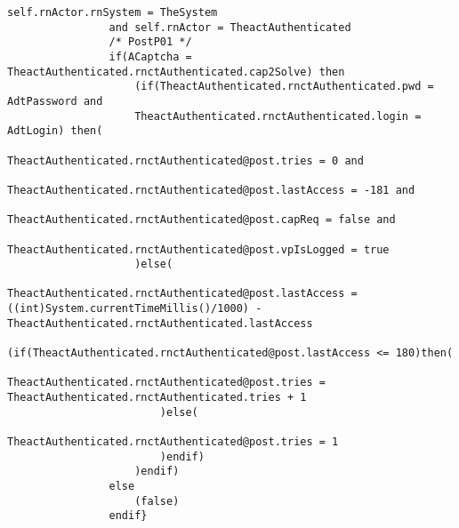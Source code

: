 \begin{lstlisting}[style=MessirStyle,firstnumber=auto,captionpos=b,caption={\msrmessir (MCL-oriented) specification of the operation \emph{oeLoginWithCaptcha}.},label=OM-actAuthenticated-oeLoginWithCaptcha-MCL-LST]
				self.rnActor.rnSystem = TheSystem
				and self.rnActor = TheactAuthenticated
				/* PostP01 */
				if(ACaptcha = TheactAuthenticated.rnctAuthenticated.cap2Solve) then
					(if(TheactAuthenticated.rnctAuthenticated.pwd = AdtPassword and
					TheactAuthenticated.rnctAuthenticated.login = AdtLogin) then(
						TheactAuthenticated.rnctAuthenticated@post.tries = 0 and
						TheactAuthenticated.rnctAuthenticated@post.lastAccess = -181 and
						TheactAuthenticated.rnctAuthenticated@post.capReq = false and
						TheactAuthenticated.rnctAuthenticated@post.vpIsLogged = true
					)else(
						TheactAuthenticated.rnctAuthenticated@post.lastAccess = ((int)System.currentTimeMillis()/1000) - TheactAuthenticated.rnctAuthenticated.lastAccess
						(if(TheactAuthenticated.rnctAuthenticated@post.lastAccess <= 180)then(
							TheactAuthenticated.rnctAuthenticated@post.tries = TheactAuthenticated.rnctAuthenticated.tries + 1
						)else(
							TheactAuthenticated.rnctAuthenticated@post.tries = 1
						)endif)
					)endif)
				else 
					(false)
				endif}
	
	\end{lstlisting}
	\normalsize 
	
	
	
	





